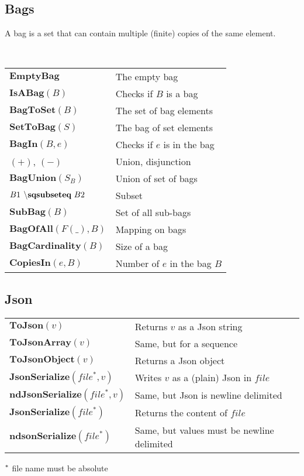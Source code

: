 \documentclass[10pt,landscape]{article}
\begin{document}
\begin{multicols}{3}
{    \subsection{Bags}
    A bag is a set that can contain multiple (finite) copies of the same
    element.

    ~
    
    \begin{tabular}{p{}|p{}}
      $\textbf{EmptyBag}$ & The empty bag \\
      $\textbf{IsABag}(B)$ & Checks if $B$ is a bag\\
      $\textbf{BagToSet}(B)$ & The set of bag elements\\
      $\textbf{SetToBag}(S)$ & The bag of set elements\\
      $\textbf{BagIn}(B,e)$ & Checks if $e$ is in the bag\\
      $(+)$, $(-)$ & Union, disjunction\\
      $\textbf{BagUnion}(S_B)$ & Union of set of bags\\
      $B1 \textbf{$~\backslash$sqsubseteq}~B2$ & Subset\\
      $\textbf{SubBag}(B)$ & Set of all sub-bags\\
      $\textbf{BagOfAll}(F(\_), B)$ & Mapping on bags\\
      $\textbf{BagCardinality}(B)$ & Size of a bag\\
      $\textbf{CopiesIn}(e, B)$ & Number of $e$ in the bag $B$
    \end{tabular}
    \subsection{Json}
    \begin{tabular}{p{}|p{}}
      $\textbf{ToJson}(v)$ & Returns $v$ as a Json string\\
      $\textbf{ToJsonArray}(v)$ & Same, but for a sequence\\
      $\textbf{ToJsonObject}(v)$ & Returns a Json object\\
      $\textbf{JsonSerialize}(file^*, v)$ & Writes $v$ as a (plain) Json in $file$\\
      $\textbf{ndJsonSerialize}(file^*, v)$ & Same, but Json is newline delimited\\
      $\textbf{JsonSerialize}(file^*)$ & Returns the content of $file$\\
      $\textbf{ndsonSerialize}(file^*)$ & Same, but values must be newline delimited\\
    \end{tabular}
    $\null^*$ file name must be absolute
  }
\end{multicols}
\end{document}
